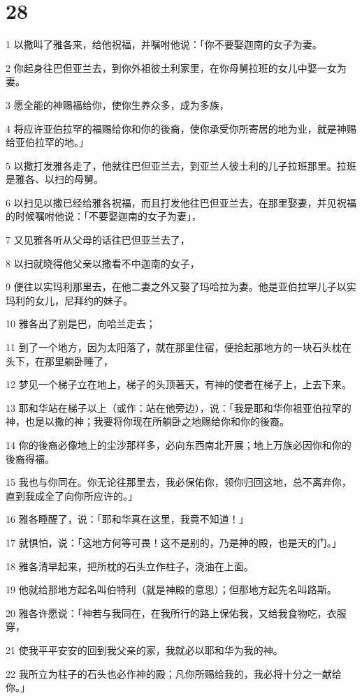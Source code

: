 \chapter{28}

\par 1 以撒叫了雅各来，给他祝福，并嘱咐他说：「你不要娶迦南的女子为妻。
\par 2 你起身往巴但亚兰去，到你外祖彼土利家里，在你母舅拉班的女儿中娶一女为妻。
\par 3 愿全能的神赐福给你，使你生养众多，成为多族，
\par 4 将应许亚伯拉罕的福赐给你和你的後裔，使你承受你所寄居的地为业，就是神赐给亚伯拉罕的地。」
\par 5 以撒打发雅各走了，他就往巴但亚兰去，到亚兰人彼土利的儿子拉班那里。拉班是雅各、以扫的母舅。
\par 6 以扫见以撒已经给雅各祝福，而且打发他往巴但亚兰去，在那里娶妻，并见祝福的时候嘱咐他说：「不要娶迦南的女子为妻」，
\par 7 又见雅各听从父母的话往巴但亚兰去了，
\par 8 以扫就晓得他父亲以撒看不中迦南的女子，
\par 9 便往以实玛利那里去，在他二妻之外又娶了玛哈拉为妻。他是亚伯拉罕儿子以实玛利的女儿，尼拜约的妹子。
\par 10 雅各出了别是巴，向哈兰走去；
\par 11 到了一个地方，因为太阳落了，就在那里住宿，便拾起那地方的一块石头枕在头下，在那里躺卧睡了，
\par 12 梦见一个梯子立在地上，梯子的头顶著天，有神的使者在梯子上，上去下来。
\par 13 耶和华站在梯子以上（或作：站在他旁边），说：「我是耶和华你祖亚伯拉罕的神，也是以撒的神；我要将你现在所躺卧之地赐给你和你的後裔。
\par 14 你的後裔必像地上的尘沙那样多，必向东西南北开展；地上万族必因你和你的後裔得福。
\par 15 我也与你同在。你无论往那里去，我必保佑你，领你归回这地，总不离弃你，直到我成全了向你所应许的。」
\par 16 雅各睡醒了，说：「耶和华真在这里，我竟不知道！」
\par 17 就惧怕，说：「这地方何等可畏！这不是别的，乃是神的殿，也是天的门。」
\par 18 雅各清早起来，把所枕的石头立作柱子，浇油在上面。
\par 19 他就给那地方起名叫伯特利（就是神殿的意思）；但那地方起先名叫路斯。
\par 20 雅各许愿说：「神若与我同在，在我所行的路上保佑我，又给我食物吃，衣服穿，
\par 21 使我平平安安的回到我父亲的家，我就必以耶和华为我的神。
\par 22 我所立为柱子的石头也必作神的殿；凡你所赐给我的，我必将十分之一献给你。」

